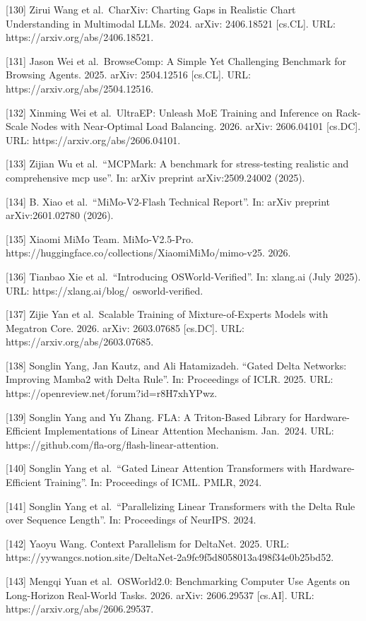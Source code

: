 \documentclass[
  10
]{article}
\begin{document}
{[}130{]} Zirui Wang et al.~CharXiv: Charting Gaps in Realistic Chart
Understanding in Multimodal LLMs. 2024. arXiv: 2406.18521 {[}cs.CL{]}.
URL: https://arxiv.org/abs/2406.18521.

{[}131{]} Jason Wei et al.~BrowseComp: A Simple Yet Challenging
Benchmark for Browsing Agents. 2025. arXiv: 2504.12516 {[}cs.CL{]}. URL:
https://arxiv.org/abs/2504.12516.

{[}132{]} Xinming Wei et al.~UltraEP: Unleash MoE Training and Inference
on Rack-Scale Nodes with Near-Optimal Load Balancing. 2026. arXiv:
2606.04101 {[}cs.DC{]}. URL: https://arxiv.org/abs/2606.04101.

{[}133{]} Zijian Wu et al.~``MCPMark: A benchmark for stress-testing
realistic and comprehensive mcp use''. In: arXiv preprint
arXiv:2509.24002 (2025).

{[}134{]} B. Xiao et al.~``MiMo-V2-Flash Technical Report''. In: arXiv
preprint arXiv:2601.02780 (2026).

{[}135{]} Xiaomi MiMo Team. MiMo-V2.5-Pro.
https://huggingface.co/collections/XiaomiMiMo/mimo-v25. 2026.

{[}136{]} Tianbao Xie et al.~``Introducing OSWorld-Verified''. In:
xlang.ai (July 2025). URL: https://xlang.ai/blog/ osworld-verified.

{[}137{]} Zijie Yan et al.~Scalable Training of Mixture-of-Experts
Models with Megatron Core. 2026. arXiv: 2603.07685 {[}cs.DC{]}. URL:
https://arxiv.org/abs/2603.07685.

{[}138{]} Songlin Yang, Jan Kautz, and Ali Hatamizadeh. ``Gated Delta
Networks: Improving Mamba2 with Delta Rule''. In: Proceedings of ICLR.
2025. URL: https://openreview.net/forum?id=r8H7xhYPwz.

{[}139{]} Songlin Yang and Yu Zhang. FLA: A Triton-Based Library for
Hardware-Efficient Implementations of Linear Attention Mechanism.
Jan.~2024. URL: https://github.com/fla-org/flash-linear-attention.

{[}140{]} Songlin Yang et al.~``Gated Linear Attention Transformers with
Hardware-Efficient Training''. In: Proceedings of ICML. PMLR, 2024.

{[}141{]} Songlin Yang et al.~``Parallelizing Linear Transformers with
the Delta Rule over Sequence Length''. In: Proceedings of NeurIPS. 2024.

{[}142{]} Yaoyu Wang. Context Parallelism for DeltaNet. 2025. URL:
https://yywangcs.notion.site/DeltaNet-2a9fc9f5d8058013a498f34e0b25bd52.

{[}143{]} Mengqi Yuan et al.~OSWorld2.0: Benchmarking Computer Use
Agents on Long-Horizon Real-World Tasks. 2026. arXiv: 2606.29537
{[}cs.AI{]}. URL: https://arxiv.org/abs/2606.29537.
\end{document}
